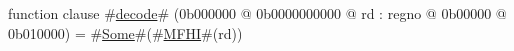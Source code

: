 function clause #\hyperref[zdecode]{decode}# (0b000000 @ 0b0000000000 @ rd : regno @ 0b00000 @ 0b010000) =
  #\hyperref[zSome]{Some}#(#\hyperref[zMFHI]{MFHI}#(rd))
